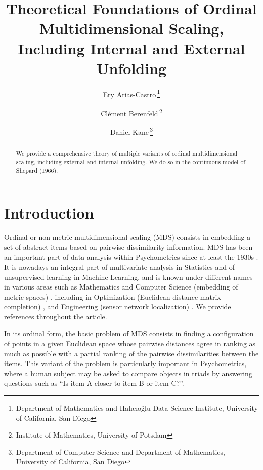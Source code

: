 \documentclass[twoside, 11pt]{article}
\begin{document}
\thispagestyle{empty}

\title{Theoretical Foundations of Ordinal Multidimensional Scaling, Including Internal and External Unfolding}
\author{
Ery Arias-Castro\,\footnote{Department of Mathematics and Halıcıoğlu Data Science Institute, University of California, San Diego} 
\and
Clément Berenfeld\,\footnote{Institute of Mathematics, University of Potsdam}
\and Daniel Kane\,\footnote{Department of Computer Science and Department of Mathematics, University of California, San Diego} 
}
\date{}
\maketitle

\begin{abstract}
We provide a comprehensive theory of multiple variants of ordinal multidimensional scaling, including external and internal unfolding. We do so in the continuous model of Shepard (1966). 
\end{abstract}



\section{Introduction} 
\label{sec:introduction}

Ordinal or non-metric multidimensional scaling (MDS) consists in embedding a set of abstract items based on pairwise dissimilarity information. MDS has been an important part of data analysis within Psychometrics since at least the 1930s \cite{young1938discussion}. 
It is nowadays an integral part of multivariate analysis in Statistics and of unsupervised learning in Machine Learning, and is known under different names in various areas such as Mathematics and Computer Science (embedding of metric spaces) \cite{blumenthal1938distance}, including in Optimization (Euclidean distance matrix completion) \cite{laurent2001matrix}, and  Engineering (sensor network localization) \cite{priyantha2003anchor}. 
We provide references throughout the article.

In its ordinal form, the basic problem of MDS consists in finding a configuration of points in a given Euclidean space whose pairwise distances agree in ranking as much as possible with a partial ranking of the pairwise dissimilarities between the items.
This variant of the problem is particularly important in Psychometrics, where a human subject may be asked to compare objects in triads \cite{torgerson1952multidimensional} by answering questions such as ``Is item A closer to item B or item C?''.
\end{document}
